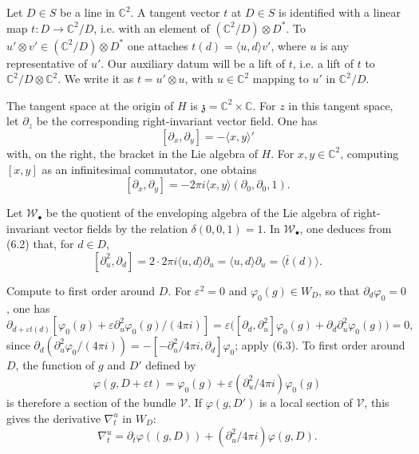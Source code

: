 \documentclass[12pt,a4paper]{article}
\theoremstyle{plain}
\theoremstyle{definition}
\theoremstyle{remark}
\begin{document}
Let $D\in S$ be a line in $\mathbb C^2$. A tangent vector $t$ at $D\in S$ is identified with a linear map $t\colon D\to \mathbb C^2/D$, i.e. with an element of $(\mathbb C^2/D)\otimes D^*$. To $u'\otimes v'\in (\mathbb C^2/D)\otimes D^*$ one attaches $t(d)=\langle u,d\rangle v'$, where $u$ is any representative of $u'$. Our auxiliary datum will be a lift of $t$, i.e. a lift of $t$ to $\mathbb C^2/D\otimes \mathbb C^2$. We write it as $t=u'\otimes u$, with $u\in \mathbb C^2$ mapping to $u'$ in $\mathbb C^2/D$.

The tangent space at the origin of $H$ is $\mathfrak z=\mathbb C^2\times \mathbb C$. For $z$ in this tangent space, let $\partial_z$ be the corresponding right-invariant vector field. One has
\[
[\partial_x,\partial_y]=-\langle x,y\rangle'
\]
with, on the right, the bracket in the Lie algebra of $H$. For $x,y\in \mathbb C^2$, computing $[x,y]$ as an infinitesimal commutator, one obtains
\begin{equation}\label{eq:6.2}
[\partial_x,\partial_y]=-2\pi i\langle x,y\rangle(\partial_0,\partial_0,1).\tag{6.2}
\end{equation}

Let $\mathscr W_\bullet$ be the quotient of the enveloping algebra of the Lie algebra of right-invariant vector fields by the relation $\delta(0,0,1)=1$. In $\mathscr W_\bullet$, one deduces from (6.2) that, for $d\in D$,
\begin{equation}\label{eq:6.3}
[\partial_u^2,\partial_d]=2\cdot 2\pi i\langle u,d\rangle\partial_u=\langle u,d\rangle\partial_u=\langle \bar t(d)\rangle.\tag{6.3}
\end{equation}

Compute to first order around $D$. For $\varepsilon^2=0$ and $\varphi_0(g)\in W_D$, so that $\partial_d\varphi_0=0$, one has
\[
\partial_{d+\varepsilon t(d)}[\varphi_0(g)+\varepsilon\partial_u^2\varphi_0(g)/(4\pi i)]
=\varepsilon\bigl([\partial_d,\partial_u^2]\varphi_0(g)+\partial_d\partial_u^2\varphi_0(g)\bigr)=0,
\]
since $\partial_d(\partial_u^2\varphi_0/(4\pi i))=-[-\partial_u^2/4\pi i,\partial_d]\varphi_0$; apply (6.3). To first order around $D$, the function of $g$ and $D'$ defined by
\[
\varphi(g,D+\varepsilon t)=\varphi_0(g)+\varepsilon(\partial_u^2/4\pi i)\varphi_0(g)
\]
is therefore a section of the bundle $\mathscr V$. If $\varphi(g,D')$ is a local section of $\mathscr V$, this gives the derivative $\nabla_t^u$ in $W_D$:
\begin{equation}\label{eq:6.5}
\nabla_t^u=\partial_t\varphi((g,D))+(\partial_u^2/4\pi i)\varphi(g,D).\tag{6.5}
\end{equation}
\end{document}
